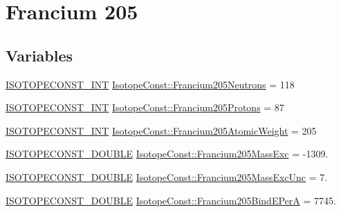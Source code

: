 \hypertarget{group___isotope_const-_francium-_fr205}{}\section{Francium 205}
\label{group___isotope_const-_francium-_fr205}
\subsection*{Variables}
\begin{DoxyCompactItemize}
\item 
\mbox{\hyperlink{group___isotope_const-_macros_ga5f18360b3e99483a35c32d789e62621c}{I\+S\+O\+T\+O\+P\+E\+C\+O\+N\+S\+T\+\_\+\+I\+NT}} \mbox{\hyperlink{group___isotope_const-_francium-_fr205_gae479977c8fd18a39de4ce342f16bb672}{Isotope\+Const\+::\+Francium205\+Neutrons}} = 118
\item 
\mbox{\hyperlink{group___isotope_const-_macros_ga5f18360b3e99483a35c32d789e62621c}{I\+S\+O\+T\+O\+P\+E\+C\+O\+N\+S\+T\+\_\+\+I\+NT}} \mbox{\hyperlink{group___isotope_const-_francium-_fr205_ga247ee0e1988334c1cf9ba4f86c11bb93}{Isotope\+Const\+::\+Francium205\+Protons}} = 87
\item 
\mbox{\hyperlink{group___isotope_const-_macros_ga5f18360b3e99483a35c32d789e62621c}{I\+S\+O\+T\+O\+P\+E\+C\+O\+N\+S\+T\+\_\+\+I\+NT}} \mbox{\hyperlink{group___isotope_const-_francium-_fr205_ga151754635cee9ed5035db69d69ef82a7}{Isotope\+Const\+::\+Francium205\+Atomic\+Weight}} = 205
\item 
\mbox{\hyperlink{group___isotope_const-_macros_ga8f45a7272ce02c0b4c65c44636ed719a}{I\+S\+O\+T\+O\+P\+E\+C\+O\+N\+S\+T\+\_\+\+D\+O\+U\+B\+LE}} \mbox{\hyperlink{group___isotope_const-_francium-_fr205_ga0a6a85199fd4496e33a69755992b7bcd}{Isotope\+Const\+::\+Francium205\+Mass\+Exc}} = -\/1309.
\item 
\mbox{\hyperlink{group___isotope_const-_macros_ga8f45a7272ce02c0b4c65c44636ed719a}{I\+S\+O\+T\+O\+P\+E\+C\+O\+N\+S\+T\+\_\+\+D\+O\+U\+B\+LE}} \mbox{\hyperlink{group___isotope_const-_francium-_fr205_ga50e5626bf1524128e2b96412e8af707d}{Isotope\+Const\+::\+Francium205\+Mass\+Exc\+Unc}} = 7.
\item 
\mbox{\hyperlink{group___isotope_const-_macros_ga8f45a7272ce02c0b4c65c44636ed719a}{I\+S\+O\+T\+O\+P\+E\+C\+O\+N\+S\+T\+\_\+\+D\+O\+U\+B\+LE}} \mbox{\hyperlink{group___isotope_const-_francium-_fr205_ga937a8d8e781a6202ea74bdcb22b7d63d}{Isotope\+Const\+::\+Francium205\+Bind\+E\+PerA}} = 7745.
\item 

\end{DoxyCompactItemize}
